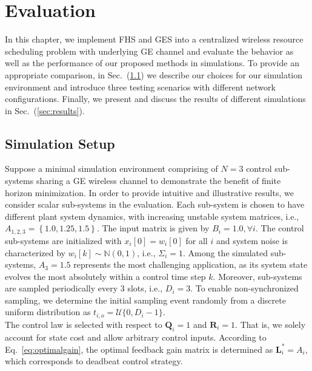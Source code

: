 \chapter{Evaluation}

In this chapter, we implement FHS and GES into a centralized wireless resource
scheduling problem with underlying GE channel and evaluate the behavior as well
as the performance of our proposed methods in simulations. To provide an
appropriate comparison, in Sec.~(\ref{sec:setup}) we describe our choices for
our simulation environment and introduce three testing scenarios with different
network configurations. Finally, we present and discuss the results of different
simulations in Sec.~(\ref{sec:results}). 

\section{Simulation Setup} \label{sec:setup}

Suppose a minimal simulation environment comprising of $N=3$ control
sub-systems sharing a GE wireless channel to demonstrate the benefit of finite
horizon minimization. In order to provide intuitive and illustrative results, we
consider scalar sub-systems in the evaluation. Each sub-system is chosen to have
different plant system dynamics, with increasing unstable system matrices, i.e.,
$A_{1,2,3} = \left\{1.0, 1.25, 1.5\right\}$. The input matrix is given by $B_i =
1.0, \forall i$. The control sub-systems are initialized with $x_i[0] = w_i[0]$
for all $i$ and system noise is characterized by $w_i[k]\sim \mathbb{N}(0,1)$,
i.e., $\Sigma_i=1$. Among the simulated sub-systems, $A_3=1.5$ represents the
most challenging application, as its system state evolves the most absolutely
within a control time step $k$. Moreover, sub-systems are sampled periodically
every 3 slots, i.e., $D_i=3$. To enable non-synchronized sampling, we determine
the initial sampling event randomly from a discrete uniform distribution as
$t_{i,o} = \mathcal{U}\{0, D_i-1\}$. \\
The control law is selected with respect to $\boldsymbol{Q}_i = 1$ and
$\boldsymbol{R}_i = 1$. That is, we solely account for state cost and allow
arbitrary control inputs. According to Eq.~\eqref{eq:optimalgain}, the optimal
feedback gain matrix is determined as $\boldsymbol{L}^*_i = A_i$, which
corresponds to deadbeat control strategy. 

